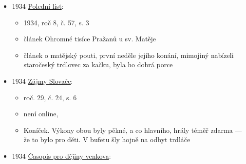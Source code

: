 \begin{itemize}
  \begin{itemize}
  \tightlist
  \item
    popisuje změny venkovskýho života, ubývá dodraných se smaženýma
    koblihama a trdleníkama
  \end{itemize}
\item
  1934
  \href{https://ceskadigitalniknihovna.cz/view/uuid:c1ecf480-9c2d-11e3-8b69-005056825209?page=uuid\%3Ac53ff231-d798-11e3-94ef-5ef3fc9ae867&fulltext=trdlovec&source=nkp}{Polední
  list}:

  \begin{itemize}
  \tightlist
  \item
    1934, roč 8, č. 57, s. 3
  \item
    článek Ohromné tisíce Pražanů u sv. Matěje
  \item
    článek o matějský pouti, první neděle jejího konání, mimojiný
    nabízeli staročeský trdlovec za kačku, byla ho dobrá porce
  \end{itemize}
\item
  1934
  \href{https://www.digitalniknihovna.cz/vkol/uuid/uuid:d55ad21d-3710-4107-b2c2-9437c23092eb}{Zájmy
  Slovače}:

  \begin{itemize}
  \tightlist
  \item
    roč. 29, č. 24, s. 6
  \item
    není online, 
  \item
    Koníček. Výkony obou byly pěkné, a co \textquotesingle hlavního,
    hrály téměř zdarma --- že to bylo pro děti. V bufetu šly hojně na
    odbyt trdláče
  \end{itemize}
\item
  1934
  \href{https://www.google.cz/books/edition/\%C4\%8Casopis_pro_d\%C4\%9Bjiny_venkova/2-ciAQAAIAAJ?hl=en&gbpv=1&bsq=trdeln\%C3\%ADk&dq=trdeln\%C3\%ADk&printsec=frontcover}{Časopis
  pro dějiny venkova}:


\end{itemize}

